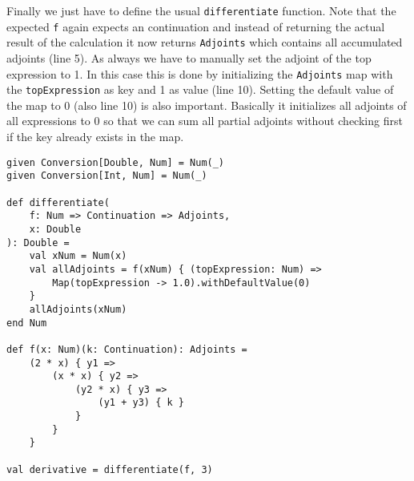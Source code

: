 Finally we just have to define the usual \lstinline{differentiate} function. Note that the expected \lstinline{f} again expects an continuation and instead of returning the actual result of the calculation it now returns \lstinline{Adjoints} which contains all accumulated adjoints (line 5). As always we have to manually set the adjoint of the top expression to 1. In this case this is done by initializing the \lstinline{Adjoints} map with the \lstinline{topExpression} as key and 1 as value (line 10). Setting the default value of the map to 0 (also line 10) is also important. Basically it initializes all adjoints of all expressions to 0 so that we can sum all partial adjoints without checking first if the key already exists in the map.
\begin{lstlisting}
given Conversion[Double, Num] = Num(_)
given Conversion[Int, Num] = Num(_)

def differentiate(
    f: Num => Continuation => Adjoints, 
    x: Double
): Double =
    val xNum = Num(x)
    val allAdjoints = f(xNum) { (topExpression: Num) =>
        Map(topExpression -> 1.0).withDefaultValue(0)
    }
    allAdjoints(xNum)
end Num

def f(x: Num)(k: Continuation): Adjoints =
    (2 * x) { y1 =>
        (x * x) { y2 =>
            (y2 * x) { y3 =>
                (y1 + y3) { k }
            }
        }
    }

val derivative = differentiate(f, 3)
\end{lstlisting}